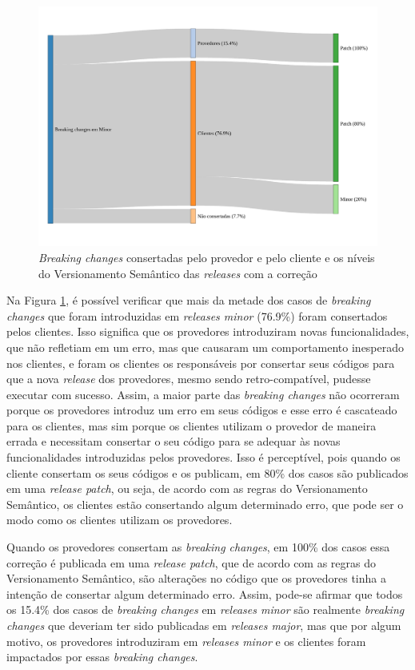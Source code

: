 \begin{figure}
    \centering
    \includegraphics[scale=0.5]{figuras/semver_fixed.pdf}
    \caption{\textit{Breaking changes} consertadas pelo provedor e pelo cliente e os níveis do Versionamento Semântico das \textit{releases} com a correção}
    \label{fig:semver_fixed}
\end{figure}{}

Na Figura \ref{fig:semver_fixed}, é possível verificar que mais da metade dos casos de \textit{breaking changes} que foram introduzidas em \textit{releases minor} (76.9\%) foram consertados pelos clientes. Isso significa que os provedores introduziram novas funcionalidades, que não refletiam em um erro, mas que causaram um comportamento inesperado nos clientes, e foram os clientes os responsáveis por consertar seus códigos para que a nova \textit{release} dos provedores, mesmo sendo retro-compatível, pudesse executar com sucesso. Assim, a maior parte das \textit{breaking changes} não ocorreram porque os provedores introduz um erro em seus códigos e esse erro é cascateado para os clientes, mas sim porque os clientes utilizam o provedor de maneira errada e necessitam consertar o seu código para se adequar às novas funcionalidades introduzidas pelos provedores. Isso é perceptível, pois quando os cliente consertam os seus códigos e os publicam, em 80\% dos casos são publicados em uma \textit{release patch}, ou seja, de acordo com as regras do Versionamento Semântico, os clientes estão consertando algum determinado erro, que pode ser o modo como os clientes utilizam os provedores.

Quando os provedores consertam as \textit{breaking changes}, em 100\% dos casos essa correção é publicada em uma \textit{release patch}, que de acordo com as regras do Versionamento Semântico, são alterações no código que os provedores tinha a intenção de consertar algum determinado erro. Assim, pode-se afirmar que todos os 15.4\% dos casos de \textit{breaking changes} em \textit{releases minor} são realmente \textit{breaking changes} que deveriam ter sido publicadas em \textit{releases major}, mas que por algum motivo, os provedores introduziram em \textit{releases minor} e os clientes foram impactados por essas \textit{breaking changes}.

